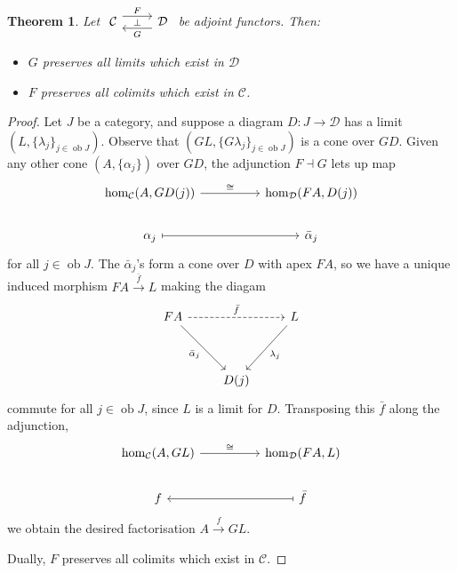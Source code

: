 \documentclass[a4paper,11pt]{article}
\theoremstyle{break_italics}
\newtheorem*{theorem*}{Theorem}
\theoremstyle{break_upright}
\theoremstyle{remark}
\newcommand{\ob}{\operatorname{ob}}
\newcommand{\C}{\mathcal{C}}
\newcommand{\D}{\mathcal{D}}
\begin{document}
\begin{theorem*}
	Let $\begin{tikzcd}
	\C & \D
	\arrow["\bot"{description}, draw=none, from=1-1, to=1-2]
	\arrow["F", shift left=2, from=1-1, to=1-2]
	\arrow["G", shift left=2, from=1-2, to=1-1]
\end{tikzcd}$ be adjoint functors. Then:
	\begin{itemize}
		\item $G$ preserves all limits which exist in $\D$
		\item $F$ preserves all colimits which exist in $\C$.
	\end{itemize}
\end{theorem*}
\begin{proof}
Let $J$ be a category, and suppose a diagram $D \colon J \to \D$ has a limit $(L, \{\lambda_j\}_{j\in\ob J})$. Observe that $(GL, \{G\lambda_j\}_{j\in\ob J})$ is a cone over $GD$. Given any other cone $(A,\{\alpha_j\})$ over $GD$, the adjunction $F \dashv G$ lets up map
\[
\begin{tikzcd}
{\hom_\C(A, GD(j))} \arrow[rr, "\cong"] &  & {\hom_\D(FA, D(j))} \\
\alpha_j \arrow[rr, maps to]            &  & \bar \alpha_j      
\end{tikzcd}
\]
for all $j \in \ob J$. The $\bar \alpha_j$'s form a cone over $D$ with apex $FA$, so we have a unique induced morphism $FA \xrightarrow{\bar f} L$ making the diagam
\[
\begin{tikzcd}
FA \arrow[rr, "\bar f", dashed] \arrow[rdd, "\bar \alpha_j"'] &      & L \arrow[ldd, "\lambda_j"] \\
                                                              &      &                            \\
                                                              & D(j) &                           
\end{tikzcd}
\]
commute for all $j \in \ob J$, since $L$ is a limit for $D$. Transposing this $\bar f$ along the adjunction,
\[
\begin{tikzcd}
{\hom_\C(A, GL)} \arrow[rr, "\cong"] &  & {\hom_\D(FA, L)}           \\
f                                    &  & \bar f \arrow[ll, maps to]
\end{tikzcd}
\]
we obtain the desired factorisation $A \xrightarrow{f} GL$.

Dually, $F$ preserves all colimits which exist in $\C$.
\end{proof}
\end{document}
